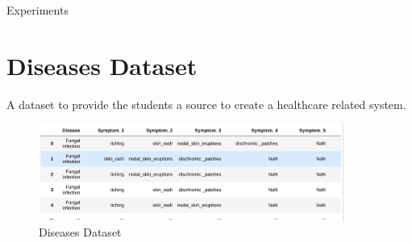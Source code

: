 \documentclass[10pt]{beamer}
\begin{document}



%

\begin{frame}{Experiments}
\section{Diseases Dataset}
A dataset to provide the students a source to create a healthcare related system.

\begin{figure}[H]
    \centering
    \includegraphics[width=10cm]{image/diseases_dataset.png}
    \caption{Diseases Dataset}
    \label{fig:di_ds}
\end{figure}

\end{frame}
\end{document}
